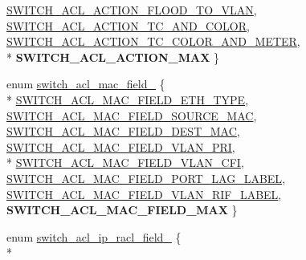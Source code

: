 \begin{DoxyCompactItemize}
\hyperlink{group__ACL_gga55dd1b7b278fc8fe549b0025fd93837ca7d75c4fcdb79bbcce0da2259a34e80c9}{S\+W\+I\+T\+C\+H\+\_\+\+A\+C\+L\+\_\+\+A\+C\+T\+I\+O\+N\+\_\+\+F\+L\+O\+O\+D\+\_\+\+T\+O\+\_\+\+V\+L\+A\+N}, 
\hyperlink{group__ACL_gga55dd1b7b278fc8fe549b0025fd93837cad731cb79215135fe3d0fc2645f8207fe}{S\+W\+I\+T\+C\+H\+\_\+\+A\+C\+L\+\_\+\+A\+C\+T\+I\+O\+N\+\_\+\+T\+C\+\_\+\+A\+N\+D\+\_\+\+C\+O\+L\+O\+R}, 
\hyperlink{group__ACL_gga55dd1b7b278fc8fe549b0025fd93837ca786a0a341174618d88b3f93a69fa8eed}{S\+W\+I\+T\+C\+H\+\_\+\+A\+C\+L\+\_\+\+A\+C\+T\+I\+O\+N\+\_\+\+T\+C\+\_\+\+C\+O\+L\+O\+R\+\_\+\+A\+N\+D\+\_\+\+M\+E\+T\+E\+R}, 
\\*
{\bfseries S\+W\+I\+T\+C\+H\+\_\+\+A\+C\+L\+\_\+\+A\+C\+T\+I\+O\+N\+\_\+\+M\+A\+X}
 \}
\item 
enum \hyperlink{group__ACL_ga015960fbc5601ee7b35606ea8471dac3}{switch\+\_\+acl\+\_\+mac\+\_\+field\+\_\+} \{ \\*
\hyperlink{group__ACL_gga015960fbc5601ee7b35606ea8471dac3a41298c1b674760e17ad380b5bea90527}{S\+W\+I\+T\+C\+H\+\_\+\+A\+C\+L\+\_\+\+M\+A\+C\+\_\+\+F\+I\+E\+L\+D\+\_\+\+E\+T\+H\+\_\+\+T\+Y\+P\+E}, 
\hyperlink{group__ACL_gga015960fbc5601ee7b35606ea8471dac3aedca2934c29a909d35960ccac5646575}{S\+W\+I\+T\+C\+H\+\_\+\+A\+C\+L\+\_\+\+M\+A\+C\+\_\+\+F\+I\+E\+L\+D\+\_\+\+S\+O\+U\+R\+C\+E\+\_\+\+M\+A\+C}, 
\hyperlink{group__ACL_gga015960fbc5601ee7b35606ea8471dac3a62ccc3d54924f8f4023a88b9b8a98d3a}{S\+W\+I\+T\+C\+H\+\_\+\+A\+C\+L\+\_\+\+M\+A\+C\+\_\+\+F\+I\+E\+L\+D\+\_\+\+D\+E\+S\+T\+\_\+\+M\+A\+C}, 
\hyperlink{group__ACL_gga015960fbc5601ee7b35606ea8471dac3a1387633b934f06fdd43cc293493f3a39}{S\+W\+I\+T\+C\+H\+\_\+\+A\+C\+L\+\_\+\+M\+A\+C\+\_\+\+F\+I\+E\+L\+D\+\_\+\+V\+L\+A\+N\+\_\+\+P\+R\+I}, 
\\*
\hyperlink{group__ACL_gga015960fbc5601ee7b35606ea8471dac3a924a8e740a7a6aa60fab87aa248c78d5}{S\+W\+I\+T\+C\+H\+\_\+\+A\+C\+L\+\_\+\+M\+A\+C\+\_\+\+F\+I\+E\+L\+D\+\_\+\+V\+L\+A\+N\+\_\+\+C\+F\+I}, 
\hyperlink{group__ACL_gga015960fbc5601ee7b35606ea8471dac3a764bcece4e2871e3be0734e4e75bdbf0}{S\+W\+I\+T\+C\+H\+\_\+\+A\+C\+L\+\_\+\+M\+A\+C\+\_\+\+F\+I\+E\+L\+D\+\_\+\+P\+O\+R\+T\+\_\+\+L\+A\+G\+\_\+\+L\+A\+B\+E\+L}, 
\hyperlink{group__ACL_gga015960fbc5601ee7b35606ea8471dac3aea952405d0b6ed84a89cbc4c67c68a28}{S\+W\+I\+T\+C\+H\+\_\+\+A\+C\+L\+\_\+\+M\+A\+C\+\_\+\+F\+I\+E\+L\+D\+\_\+\+V\+L\+A\+N\+\_\+\+R\+I\+F\+\_\+\+L\+A\+B\+E\+L}, 
{\bfseries S\+W\+I\+T\+C\+H\+\_\+\+A\+C\+L\+\_\+\+M\+A\+C\+\_\+\+F\+I\+E\+L\+D\+\_\+\+M\+A\+X}
 \}
\item 
enum \hyperlink{group__ACL_gaf0f1f49088b56fbe530ae19b8db6b4fb}{switch\+\_\+acl\+\_\+ip\+\_\+racl\+\_\+field\+\_\+} \{ \\*

\end{DoxyCompactItemize}
